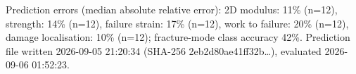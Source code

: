 Prediction errors (median absolute relative error): 2D modulus: 11\% (n=12), strength: 14\% (n=12), failure strain: 17\% (n=12), work to failure: 20\% (n=12), damage localisation: 10\% (n=12); fracture-mode class accuracy 42\%.
 Prediction file  written 2026-09-05 21:20:34 (SHA-256 2eb2d80ae41ff32b\ldots), evaluated 2026-09-06 01:52:23.